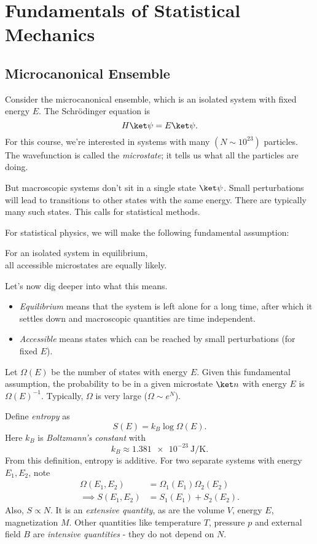 \documentclass[12pt]{article}
\begin{document}
\section{Fundamentals of Statistical Mechanics}
\label{sec:fundamentals}

\subsection{Microcanonical Ensemble}
\label{sub:micro_ens}

Consider the microcanonical ensemble, which is an isolated system with fixed energy $E$. The Schr\"odinger equation is
 \[
H \ket \psi = E \ket \psi.
\]
For this course, we're interested in systems with many $(N \sim 10^{23})$ particles. The wavefunction is called the \emph{microstate}; it tells us what all the particles are doing.

But macroscopic systems don't sit in a single state $\ket \psi$. Small perturbations will lead to transitions to other states with the same energy. There are typically many such states. This calls for statistical methods.

For statistical physics, we will make the following fundamental assumption:
\begin{center}
For an isolated system in equilibrium,\\all accessible microstates are equally likely.
\end{center}

Let's now dig deeper into what this means.
\begin{itemize}
	\item \emph{Equilibrium} means that the system is left alone for a long time, after which it settles down and macroscopic quantities are time independent.
	\item \emph{Accessible} means states which can be reached by small perturbations (for fixed $E$).
\end{itemize}

Let $\Omega(E)$ be the number of states with energy $E$. Given this fundamental assumption, the probability to be in a given microstate $\ket n$ with energy $E$ is $\Omega(E)^{-1}$. Typically, $\Omega$ is very large ($\Omega \sim e^{N}$).

Define \emph{entropy} as
\[
S(E) = k_B \log \Omega(E).
\]
Here $k_B$ is \emph{Boltzmann's constant} with
\[
	k_B \approx \qty{1.381e-23}{\joule\per\kelvin}.
\]
From this definition, entropy is additive. For two separate systems with energy $E_1, E_2$, note
\begin{align*}
	\Omega(E_1, E_2) &= \Omega_1(E_1)\Omega_2(E_2) \\
	\implies S(E_1, E_2) &= S_1(E_1) + S_2(E_2).
\end{align*}
Also, $S \propto N$. It is an \emph{extensive quantity}, as are the volume $V$, energy $E$, magnetization $M$. Other quantities like temperature $T$, pressure $p$ and external field $B$ are \emph{intensive quantities} - they do not depend on $N$.
\end{document}
